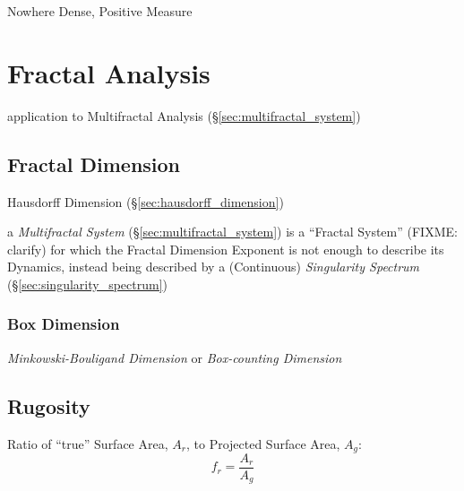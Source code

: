 Nowhere Dense, Positive Measure



\section{Fractal Analysis}\label{sec:fractal_analysis}

application to Multifractal Analysis (\S\ref{sec:multifractal_system})



\subsection{Fractal Dimension}\label{sec:fractal_dimension}

Hausdorff Dimension (\S\ref{sec:hausdorff_dimension})

\fist a \emph{Multifractal System} (\S\ref{sec:multifractal_system}) is a
``Fractal System'' (FIXME: clarify) for which the Fractal Dimension Exponent is
not enough to describe its Dynamics, instead being described by a (Continuous)
\emph{Singularity Spectrum} (\S\ref{sec:singularity_spectrum})



\subsubsection{Box Dimension}\label{sec:box_dimension}

\emph{Minkowski-Bouligand Dimension} or \emph{Box-counting Dimension}



\subsection{Rugosity}\label{sec:rugosity}

Ratio of ``true'' Surface Area, $A_r$, to Projected Surface Area, $A_g$:
\[
  f_r = \frac{A_r}{A_g}
\]



